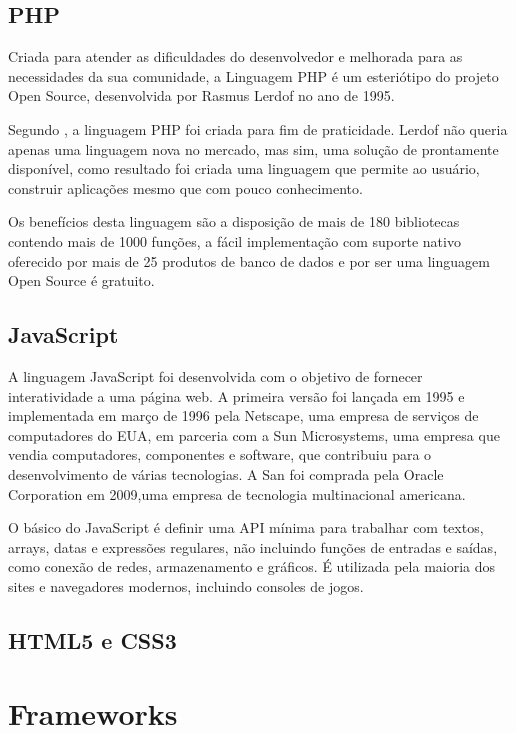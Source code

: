 \subsection{PHP}

Criada para atender as dificuldades do desenvolvedor e melhorada para as necessidades da sua comunidade, a Linguagem PHP é um esteriótipo do projeto Open Source, desenvolvida por Rasmus Lerdof no ano de 1995.

Segundo , a linguagem PHP foi criada para fim de praticidade. Lerdof não queria apenas uma linguagem nova no mercado, mas sim, uma solução de prontamente disponível, como resultado foi criada uma linguagem que permite ao usuário, construir aplicações mesmo que com pouco conhecimento.

Os benefícios desta linguagem são a disposição de mais de 180 bibliotecas contendo mais de 1000 funções, a fácil implementação com suporte nativo oferecido por mais de 25 produtos de banco de dados e por ser uma linguagem Open Source é gratuito.


\subsection{JavaScript}

A linguagem JavaScript foi desenvolvida com o objetivo de fornecer interatividade a uma página web. A primeira versão foi lançada em 1995 e implementada em março de 1996 pela Netscape, uma empresa de serviços de computadores do EUA, em parceria com a Sun Microsystems, uma empresa que vendia computadores, componentes e software, que contribuiu para o desenvolvimento de várias tecnologias. A San foi comprada pela Oracle Corporation em 2009,uma empresa de tecnologia multinacional americana.

O básico do JavaScript é definir uma API mínima para trabalhar com textos, arrays, datas e expressões regulares, não incluindo funções de entradas e saídas, como conexão de redes, armazenamento e gráficos. É utilizada pela maioria dos sites e navegadores modernos, incluindo consoles de jogos.\cite{flanagan2004javascript}

\subsection{HTML5 e CSS3}



\section{Frameworks}

